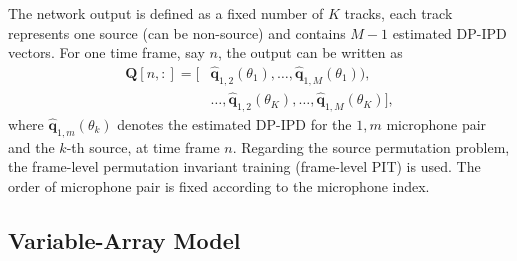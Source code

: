\documentclass[lettersize,journal]{IEEEtran}
\begin{document}

The network output is defined as a fixed number of $K$ tracks, each track represents one source (can be non-source) and contains $M-1$ estimated DP-IPD vectors. For one time frame, say $n$, the output  can be written as 
\begin{equation}
\begin{aligned}
        \mathbf{Q}[n,:] = [&\mathbf{\hat{q}}_{1,2}(\theta_1),\dots,\mathbf{\hat{q}}_{1,M}(\theta_1)),  \\ &\dots,\mathbf{\hat{q}}_{1,2}(\theta_K),\dots,\mathbf{\hat{q}}_{1,M}(\theta_K)], 
\end{aligned}
\end{equation}
where $\mathbf{\hat{q}}_{1,m}(\theta_k)$ denotes the estimated DP-IPD for the $1,m$ microphone pair and the $k$-th source, at time frame $n$.
Regarding the source permutation problem, the frame-level permutation invariant training (frame-level PIT) is used. The order of microphone pair is fixed according to the microphone index. 

\subsection{Variable-Array Model}
\end{document}
